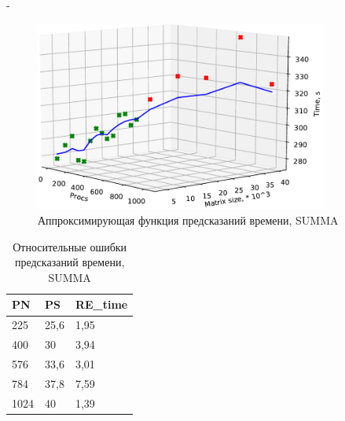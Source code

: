 \documentclass[unicode, t, 11pt]{beamer}%
\newlength{\mylen}
\begin{document}
\begin{frame}
\begin{columns}[T]
\begin{column}{\mylen}
		 			\end{column}
		 			\begin{column}{\dimexpr\textwidth-\mylen}
			 			\begin{figure}
			 				\captionsetup{font=tiny, labelfont=tiny}
							\centering
							\includegraphics[width=0.9\textwidth]{./images/ccc}
							\caption{Аппроксимирующая функция предсказаний времени, SUMMA}
							\label{graph_SUMMA}
						\end{figure}
						\begin{table}
			 			\captionsetup{font=tiny, labelfont=tiny}
			 			\tiny
							\begin{tabularx}{\textwidth}{|X|X|X|}
							\hline
							PN   & PS   & RE\_time        \\ \hline
							225  & 25,6 & 1,95            \\ \hline
							400  & 30   & 3,94            \\ \hline
							576  & 33,6 & 3,01            \\ \hline
							784  & 37,8 & 7,59            \\ \hline
							1024 & 40   & 1,39            \\ \hline
							\end{tabularx}
						\caption{Относительные ошибки предсказаний времени, SUMMA}
					\end{table}
					\end{column}
		 		\end{columns}
			\end{frame}
\end{document}

